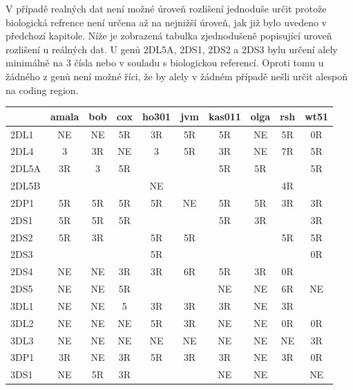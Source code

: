 \documentclass[czech,DP]{thesiskiv}
\numberwithin{equation}{section}
\begin{document}
\noindent
V případě realných dat není možné úroveň rozlišení jednoduše určit protože biologická refrence není určena až na nejnižší úroveň, jak již bylo uvedeno v předchozí kapitole. Níže je zobrazená tabulka zjednodušeně popisující uroveň rozlišení u reálných dat. U genů 2DL5A, 2DS1, 2DS2 a 2DS3 bylu určení alely minimálně na 3 čísla nebo v souladu s biologickou referencí. Oproti tomu u žádného z genů není možné říci, že by alely v žádném případě nešli určit alespoň na coding region.

\begin{center}
\tiny
{}
\begin{tabular}{l || c | c | c | c | c | c | c | c | c}
& amala & bob & cox & ho301 & jvm & kas011 & olga & rsh & wt51  \\
\hline
\hline
2DL1 & NE & NE & 5R & 3R & 5R & 5R & NE & 5R & 0R\\
2DL4 & 3 & 3R & NE & 3 & 5R & 3R & NE & 7R & 5R \\
2DL5A & 3R & 3 & 5R & &  & 5R & 5R & & 5R\\ 
2DL5B &  &  &  & NE & &  & & 4R & \\
2DP1 & 5R & 5R & 5R & 5R & NE & 5R & 5R & 3R & 3R \\
2DS1 & 5R & 5R & 5R & & & 5R & 3R & & 3R\\
2DS2  & 5R & 3R & & 5R & 5R & & & 5R & 5R\\ 
2DS3 & &  & & 5R & & & & & 0R\\
2DS4 & NE & NE & 3R & 3R & 6R & 5R & 3R & 0R &  \\
2DS5 & NE & NE & 5R & & & NE & NE & 6R & NE \\
3DL1 & NE & NE & 5 & 3R & 3R & 3R & NE & 3R &  \\
3DL2 & NE & NE & NE & 5R & 3R & NE & NE & 0R & 0R\\ 
3DL3 & NE & NE & NE & NE & NE & NE & NE & NE & 3R\\
3DP1 & 3R & NE & 3R & 5R & 3R & 3R & NE & 3R & 0R\\
3DS1 & NE & 5R & 3R &  & &  NE & NE & & NE\\


\end{tabular}
\end{center}
\end{document}
